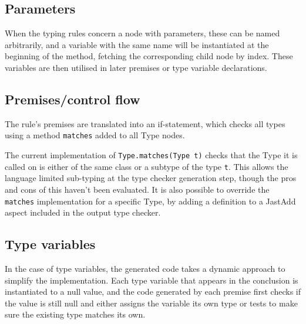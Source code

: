 \documentclass[nofilelist]{cslthse-msc}
\begin{document}
\subsection{Parameters}
When the typing rules concern a node with parameters, these can be named arbitrarily, and a variable with the same name will be instantiated at the beginning of the method, fetching the corresponding child node by index.
These variables are then utilised in later premises or type variable declarations.

\subsection{Premises/control flow}
The rule's premises are translated into an if-statement, which checks all types using a method \verb|matches| added to all Type nodes.

The current implementation of \verb|Type.matches(Type t)| checks that the Type it is called on is either of the same class or a subtype of the type \verb|t|.
This allows the language limited sub-typing at the type checker generation step, though the pros and cons of this haven't been evaluated.
It is also possible to override the \verb|matches| implementation for a specific Type, by adding a definition to a JastAdd aspect included in the output type checker.

\subsection{Type variables}
In the case of type variables, the generated code takes a dynamic approach to simplify the implementation.
Each type variable that appears in the conclusion is instantiated to a null value, and the code generated by each premise first checks if the value is still null and either assigns the variable its own type or tests to make sure the existing type matches its own.

\end{document}
